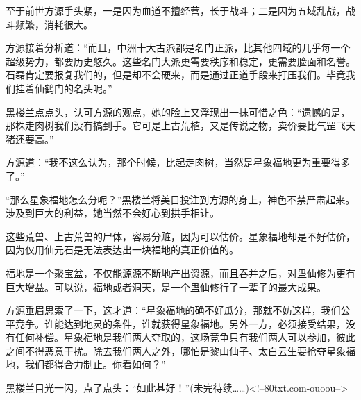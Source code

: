 \begin{this_body}
至于前世方源手头紧，一是因为血道不擅经营，长于战斗；二是因为五域乱战，战斗频繁，消耗很大。

方源接着分析道：“而且，中洲十大古派都是名门正派，比其他四域的几乎每一个超级势力，都要历史悠久。这些名门大派更需要秩序和稳定，更需要脸面和名誉。石磊肯定要报复我们的，但是却不会硬来，而是通过正道手段来打压我们。毕竟我们挂着仙鹤门的名头呢。”

黑楼兰点点头，认可方源的观点，她的脸上又浮现出一抹可惜之色：“遗憾的是，那株走肉树我们没有搞到手。它可是上古荒植，又是传说之物，卖价要比气罡飞天猪还要高。”

方源道：“我不这么认为，那个时候，比起走肉树，当然是星象福地更为重要得多了。”

“那么星象福地怎么分呢？”黑楼兰将美目投注到方源的身上，神色不禁严肃起来。涉及到巨大的利益，她当然不会好心到拱手相让。

这些荒兽、上古荒兽的尸体，容易分赃，因为可以估价。星象福地却是不好估价，因为仅用仙元石是无法表达出一块福地的真正价值的。

福地是一个聚宝盆，不仅能源源不断地产出资源，而且吞并之后，对蛊仙修为更有巨大增益。可以说，福地或者洞天，是一个蛊仙修行了一辈子的最大成果。

方源垂眉思索了一下，这才道：“星象福地的确不好瓜分，那就不妨这样，我们公平竞争。谁能达到地灵的条件，谁就获得星象福地。另外一方，必须接受结果，没有任何补偿。星象福地是我们两人夺取的，这场竞争只有我们两人可以参加，彼此之间不得恶意干扰。除去我们两人之外，哪怕是黎山仙子、太白云生要抢夺星象福地，我们都得合力制止。你看如何？”

黑楼兰目光一闪，点了点头：“如此甚好！”(未完待续……)<!--80txt.com-ouoou-->

\end{this_body}

